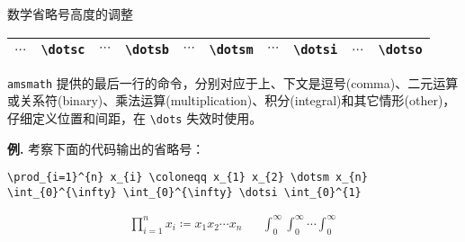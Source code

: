 \documentclass[mathserif]{beamer}
\newcommand{\codegreen}[1]{\textcolor{codegreen}{#1}}
\newenvironment{instance}{\zihao{-5}\textbf{\songti \codegreen{例.}}}{\hfill\par}
\begin{document}
\begin{frame}[fragile]{数学省略号}{高度的调整}
\begin{table}[H]
\centering
\begin{tabular}{cc|cc|cc|cc|cc}
	\toprule
	$\dotsc$ & \lstinline'\dotsc' & $\dotsb$ & \lstinline'\dotsb' & $\dotsm$ & \lstinline'\dotsm' & $\dotsi$ & \lstinline'\dotsi' & $\dotso$ & \lstinline'\dotso' \\
	\bottomrule
\end{tabular}
\end{table}
\verb'amsmath' 提供的最后一行的命令，分别对应于上、下文是逗号(comma)、二元运算或关系符(binary)、乘法运算(multiplication)、积分(integral)和其它情形(other)，仔细定义位置和间距，在 \lstinline'\dots' 失效时使用。

\begin{instance}
	考察下面的代码输出的省略号：
\begin{lstlisting}[numbers=none]
\prod_{i=1}^{n} x_{i} \coloneqq x_{1} x_{2} \dotsm x_{n}
\int_{0}^{\infty} \int_{0}^{\infty} \dotsi \int_{0}^{1}
\end{lstlisting}
\begin{align*}
	\prod_{i=1}^{n} x_{i} \coloneqq x_{1} x_{2} \dotsm x_{n} &&
	\int_{0}^{\infty} \int_{0}^{\infty} \dotsi \int_{0}^{\infty}
\end{align*}
\end{instance}
\end{frame}
\end{document}
